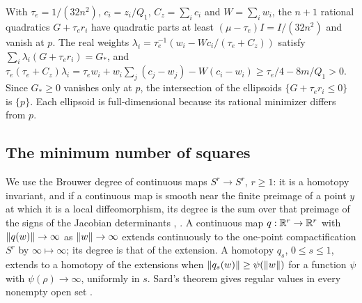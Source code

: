 \begin{remark}
\label{rem:algebraic-cyclic-ellipsoids}
With $\tau_e=1/(32n^2)$, $c_i=z_i/Q_1$, $C_z=\sum_ic_i$ and $W=\sum_iw_i$, the
$n+1$ rational quadratics $G+\tau_er_i$ have quadratic parts at least
$(\mu-\tau_e)I=I/(32n^2)$ and vanish at $p$. The real weights
$\lambda_i=\tau_e^{-1}(w_i-Wc_i/(\tau_e+C_z))$ satisfy
$\sum_i\lambda_i(G+\tau_er_i)=G_*$, and
$\tau_e(\tau_e+C_z)\lambda_i=\tau_ew_i+w_i\sum_j(c_j-w_j)-W(c_i-w_i)\ge\tau_e/4-8m/Q_1>0$.
Since $G_*\ge0$ vanishes only at $p$, the intersection of the ellipsoids
$\{G+\tau_er_i\le0\}$ is $\{p\}$. Each ellipsoid is full-dimensional because
its rational minimizer differs from $p$.
\end{remark}

\subsection{The minimum number of squares}
\label{app:algebraic-length}

We use the Brouwer degree of continuous maps $S^r\to S^r$, $r\ge1$: it is a
homotopy invariant, and if a continuous map is smooth near the finite
preimage of a point $y$ at which it is a local diffeomorphism, its degree is
the sum over that preimage of the signs of the Jacobian determinants
\cite[Proposition~2.30]{Hatcher2002}, \cite[Sections~4--5]{Milnor1965}. A
continuous map $q:\mathbb R^r\to\mathbb R^r$ with $\left\lVert q(w)\right\rVert\to\infty$ as
$\left\lVert w\right\rVert\to\infty$ extends continuously to the one-point compactification
$S^r$ by $\infty\mapsto\infty$; its degree is that of the extension. A
homotopy $q_s$, $0\le s\le1$, extends to a homotopy of the extensions when
$\left\lVert q_s(w)\right\rVert\ge\psi(\left\lVert w\right\rVert)$ for a function $\psi$ with
$\psi(\rho)\to\infty$, uniformly in $s$. Sard's theorem gives regular values
in every nonempty open set \cite[Section~3]{Milnor1965}.

